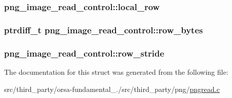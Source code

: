 \subsubsection[{local\+\_\+row}]{ png\+\_\+image\+\_\+read\+\_\+control\+::local\+\_\+row}\label{structpng__image__read__control_a6eeb91a1255a2baae9a1f3981285939e}
\hypertarget{structpng__image__read__control_ac788a77c56f6b93e57041361dbfc2bb9}{}
\subsubsection[{row\+\_\+bytes}]{\setlength{\rightskip}{0pt plus 5cm}ptrdiff\+\_\+t png\+\_\+image\+\_\+read\+\_\+control\+::row\+\_\+bytes}\label{structpng__image__read__control_ac788a77c56f6b93e57041361dbfc2bb9}
\hypertarget{structpng__image__read__control_a208248176819e1320a7f4ea4c6594ba0}{}
\subsubsection[{row\+\_\+stride}]{ png\+\_\+image\+\_\+read\+\_\+control\+::row\+\_\+stride}\label{structpng__image__read__control_a208248176819e1320a7f4ea4c6594ba0}


The documentation for this struct was generated from the following file\+:\begin{DoxyCompactItemize}
\item 
src/third\+\_\+party/orsa-\/fundamental\+\_./src/third\+\_\+party/png/\hyperlink{pngread_8c}{pngread.\+c}\end{DoxyCompactItemize}
